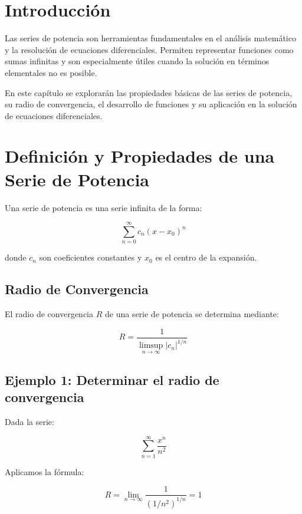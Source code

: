 \section{Introducción}
Las series de potencia son herramientas fundamentales en el análisis matemático y la resolución de ecuaciones diferenciales. Permiten representar funciones como sumas infinitas y son especialmente útiles cuando la solución en términos elementales no es posible.

En este capítulo se explorarán las propiedades básicas de las series de potencia, su radio de convergencia, el desarrollo de funciones y su aplicación en la solución de ecuaciones diferenciales.

\section{Definición y Propiedades de una Serie de Potencia}
Una serie de potencia es una serie infinita de la forma:

\begin{equation}
\sum_{n=0}^{\infty} c_n (x - x_0)^n
\end{equation}

donde \( c_n \) son coeficientes constantes y \( x_0 \) es el centro de la expansión.

\subsection{Radio de Convergencia}
El radio de convergencia \( R \) de una serie de potencia se determina mediante:

\begin{equation}
R = \frac{1}{\limsup\limits_{n \to \infty} |c_n|^{1/n}}
\end{equation}

\subsection*{Ejemplo 1: Determinar el radio de convergencia}
Dada la serie:

\begin{equation}
\sum_{n=1}^{\infty} \frac{x^n}{n^2}
\end{equation}

Aplicamos la fórmula:

\begin{equation}
R = \lim_{n \to \infty} \frac{1}{(1/n^2)^{1/n}} = 1
\end{equation}


